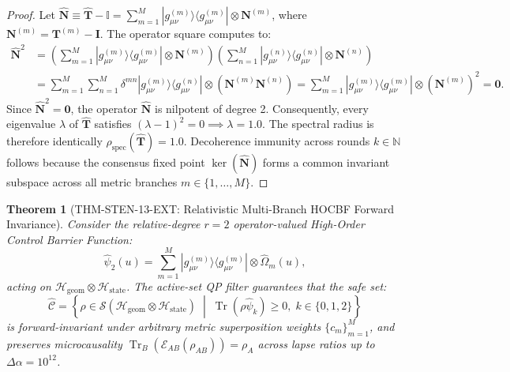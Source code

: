\documentclass[11pt,onecolumn]{article}
\newtheorem{theorem}{Theorem}
\begin{document}
\begin{proof}
Let $\hat{\mathbf{N}} \equiv \hat{\mathbf{T}} - \mathbb{I} = \sum_{m=1}^M |g_{\mu\nu}^{(m)}\rangle \langle g_{\mu\nu}^{(m)}| \otimes \mathbf{N}^{(m)}$, where $\mathbf{N}^{(m)} = \mathbf{T}^{(m)} - \mathbf{I}$. The operator square computes to:
\begin{align*}
    \hat{\mathbf{N}}^2
    &= \left( \sum_{m=1}^M |g_{\mu\nu}^{(m)}\rangle \langle g_{\mu\nu}^{(m)}| \otimes \mathbf{N}^{(m)} \right) \left( \sum_{n=1}^M |g_{\mu\nu}^{(n)}\rangle \langle g_{\mu\nu}^{(n)}| \otimes \mathbf{N}^{(n)} \right) \\
    &= \sum_{m=1}^M \sum_{n=1}^M \delta^{mn} |g_{\mu\nu}^{(m)}\rangle \langle g_{\mu\nu}^{(n)}| \otimes (\mathbf{N}^{(m)} \mathbf{N}^{(n)})
    = \sum_{m=1}^M |g_{\mu\nu}^{(m)}\rangle \langle g_{\mu\nu}^{(m)}| \otimes (\mathbf{N}^{(m)})^2 = \mathbf{0}.
\end{align*}
Since $\hat{\mathbf{N}}^2 = \mathbf{0}$, the operator $\hat{\mathbf{N}}$ is nilpotent of degree 2. Consequently, every eigenvalue $\lambda$ of $\hat{\mathbf{T}}$ satisfies $(\lambda - 1)^2 = 0 \implies \lambda = 1.0$. The spectral radius is therefore identically $\rho_{\mathrm{spec}}(\hat{\mathbf{T}}) = 1.0$. Decoherence immunity across rounds $k \in \mathbb{N}$ follows because the consensus fixed point $\operatorname{ker}(\hat{\mathbf{N}})$ forms a common invariant subspace across all metric branches $m \in \{1, \dots, M\}$.
\end{proof}

\begin{theorem}[THM-STEN-13-EXT: Relativistic Multi-Branch HOCBF Forward Invariance]
\label{thm:hocbf_invariance_ext}
Consider the relative-degree $r = 2$ operator-valued High-Order Control Barrier Function:
\begin{equation}
    \hat{\psi}_2(u) = \sum_{m=1}^M |g_{\mu\nu}^{(m)}\rangle \langle g_{\mu\nu}^{(m)}| \otimes \hat{\Omega}_m(u),
\end{equation}
acting on $\mathcal{H}_{\mathrm{geom}} \otimes \mathcal{H}_{\mathrm{state}}$. The active-set QP filter guarantees that the safe set:
\begin{equation}
    \hat{\mathcal{C}} = \left\{ \rho \in \mathcal{S}(\mathcal{H}_{\mathrm{geom}} \otimes \mathcal{H}_{\mathrm{state}}) \;\middle|\; \operatorname{Tr}(\rho \hat{\psi}_k) \ge 0, \; k \in \{0, 1, 2\} \right\}
\end{equation}
is forward-invariant under arbitrary metric superposition weights $\{c_m\}_{m=1}^M$, and preserves microcausality $\operatorname{Tr}_B(\mathcal{E}_{AB}(\rho_{AB})) = \rho_A$ across lapse ratios up to $\Delta\alpha = 10^{12}$.
\end{theorem}
\end{document}
